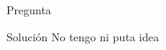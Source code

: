 \begin{homeworkProblem}
  Pregunta
  \begin{solucion}
    Solución
    No tengo ni puta idea
    \demostrado
  \end{solucion}  
\end{homeworkProblem}
